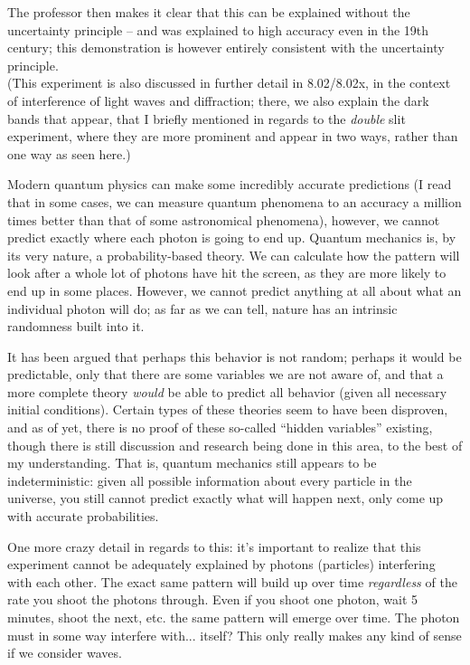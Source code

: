 The professor then makes it clear that this can be explained without the uncertainty principle -- and was explained to high accuracy even in the 19th century; this demonstration is however entirely consistent with the uncertainty principle.\\
(This experiment is also discussed in further detail in 8.02/8.02x, in the context of interference of light waves and diffraction; there, we also explain the dark bands that appear, that I briefly mentioned in regards to the \emph{double} slit experiment, where they are more prominent and appear in two ways, rather than one way as seen here.)

Modern quantum physics can make some incredibly accurate predictions (I read that in some cases, we can measure quantum phenomena to an accuracy a million times better than that of some astronomical phenomena), however, we cannot predict exactly where each photon is going to end up. Quantum mechanics is, by its very nature, a probability-based theory. We can calculate how the pattern will look after a whole lot of photons have hit the screen, as they are more likely to end up in some places. However, we cannot predict anything at all about what an individual photon will do; as far as we can tell, nature has an intrinsic randomness built into it.

It has been argued that perhaps this behavior is not random; perhaps it would be predictable, only that there are some variables we are not aware of, and that a more complete theory \emph{would} be able to predict all behavior (given all necessary initial conditions). Certain types of these theories seem to have been disproven, and as of yet, there is no proof of these so-called ``hidden variables'' existing, though there is still discussion and research being done in this area, to the best of my understanding. That is, quantum mechanics still appears to be indeterministic: given all possible information about every particle in the universe, you still cannot predict exactly what will happen next, only come up with accurate probabilities.

One more crazy detail in regards to this: it's important to realize that this experiment cannot be adequately explained by photons (particles) interfering with each other. The exact same pattern will build up over time \emph{regardless} of the rate you shoot the photons through. Even if you shoot one photon, wait 5 minutes, shoot the next, etc. the same pattern will emerge over time. The photon must in some way interfere with... itself? This only really makes any kind of sense if we consider waves.

